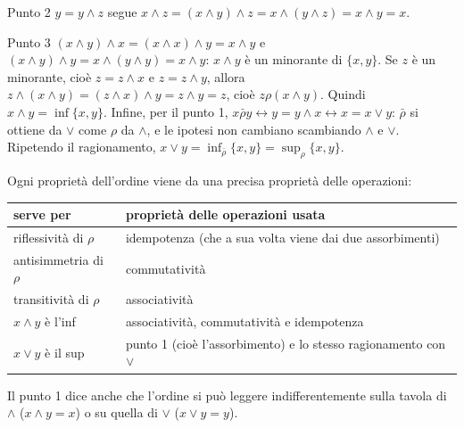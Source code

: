 \begin{concetto}
\begin{dimostrazione}
\begin{caso}{Punto 2}
        $y = y \wedge z$ segue $x \wedge z = (x \wedge y) \wedge z = x \wedge (y \wedge z) = x \wedge y = x$.
    \end{caso}
    \begin{caso}{Punto 3}
        $(x \wedge y) \wedge x = (x \wedge x) \wedge y = x \wedge y$ e $(x \wedge y) \wedge y = x \wedge (y \wedge y) = x \wedge y$: $x \wedge y$ è un minorante di $\{x, y\}$. Se $z$ è un
        minorante, cioè $z = z \wedge x$ e $z = z \wedge y$, allora $z \wedge (x \wedge y) = (z \wedge x) \wedge y = z \wedge y = z$, cioè $z \rho (x \wedge y)$. Quindi $x \wedge y = \inf\{x, y\}$.
        Infine, per il punto 1, $x \bar{\rho} y \leftrightarrow y = y \wedge x \leftrightarrow x = x \vee y$: $\bar{\rho}$ si ottiene da $\vee$ come $\rho$ da $\wedge$, e le ipotesi
        non cambiano scambiando $\wedge$ e $\vee$. Ripetendo il ragionamento, $x \vee y = \inf_{\bar{\rho}}\{x, y\} = \sup_\rho\{x, y\}$.
    \end{caso}
\end{dimostrazione}
\end{concetto}

\begin{spiegazione}
    Ogni proprietà dell'ordine viene da una precisa proprietà delle operazioni:
    \begin{center}
    \renewcommand{\arraystretch}{1.25}
    \begin{tabular}{l|l}
        \textbf{serve per} & \textbf{proprietà delle operazioni usata} \\ \hline
        riflessività di $\rho$ & idempotenza (che a sua volta viene dai due assorbimenti) \\
        antisimmetria di $\rho$ & commutatività \\
        transitività di $\rho$ & associatività \\
        $x \wedge y$ è l'inf & associatività, commutatività e idempotenza \\
        $x \vee y$ è il sup & punto 1 (cioè l'assorbimento) e lo stesso ragionamento con $\vee$ \\
    \end{tabular}
    \end{center}
    Il punto 1 dice anche che l'ordine si può leggere indifferentemente sulla tavola di $\wedge$ ($x \wedge y = x$) o su quella di $\vee$ ($x \vee y = y$).
\end{spiegazione}

